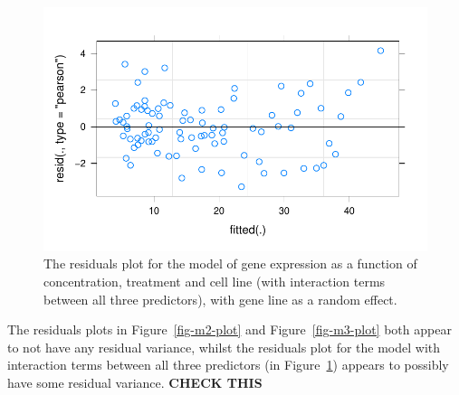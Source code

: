 \documentclass[
  letterpaper,
  DIV=11,
  numbers=noendperiod]{scrartcl}
\begin{document}
\begin{figure}

{\centering \includegraphics{2023-05-16_IMRaD-report_AStephenson_files/figure-pdf/fig-m4-plot-1.pdf}

}

\caption{\label{fig-m4-plot}The residuals plot for the model of gene
expression as a function of concentration, treatment and cell line (with
interaction terms between all three predictors), with gene line as a
random effect.}

\end{figure}

The residuals plots in Figure~\ref{fig-m2-plot} and
Figure~\ref{fig-m3-plot} both appear to not have any residual variance,
whilst the residuals plot for the model with interaction terms between
all three predictors (in Figure~\ref{fig-m4-plot}) appears to possibly
have some residual variance. \textbf{CHECK THIS}
\end{document}
